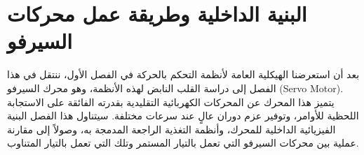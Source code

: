 \chapter{البنية الداخلية وطريقة عمل محركات السيرفو}
\label{ch:servo_anatomy}

بعد أن استعرضنا الهيكلية العامة لأنظمة التحكم بالحركة في الفصل الأول، ننتقل في هذا الفصل إلى دراسة القلب النابض لهذه الأنظمة، وهو محرك السيرفو (\textenglish{Servo Motor}). يتميز هذا المحرك عن المحركات الكهربائية التقليدية بقدرته الفائقة على الاستجابة اللحظية للأوامر، وتوفير عزم دوران عالٍ عند سرعات مختلفة. سيتناول هذا الفصل البنية الفيزيائية الداخلية للمحرك، وأنظمة التغذية الراجعة المدمجة به، وصولاً إلى مقارنة عملية بين محركات السيرفو التي تعمل بالتيار المستمر وتلك التي تعمل بالتيار المتناوب.

\vspace{0.5cm}



